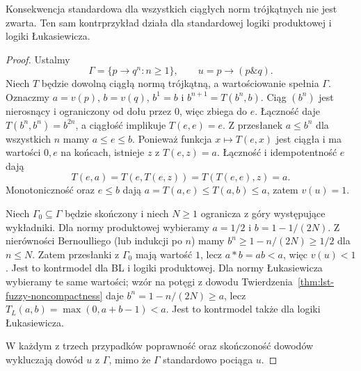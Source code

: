 \begin{twierdzenie}
\label{thm:lst-fuzzy-bl-noncompactness}
Konsekwencja standardowa dla wszystkich ciągłych norm
trójkątnych nie jest zwarta. Ten sam kontrprzykład działa
dla standardowej logiki produktowej i logiki Łukasiewicza.
\end{twierdzenie}
\begin{proof}
Ustalmy
\[
 \Gamma=\{p\to q^n:n\geq1\},\qquad
 u=p\to(p\mathbin{\&}q).
\]
Niech $T$ będzie dowolną ciągłą normą trójkątną,
a wartościowanie spełnia $\Gamma$. Oznaczmy $a=v(p)$,
$b=v(q)$, $b^1=b$ i $b^{n+1}=T(b^n,b)$.
Ciąg $(b^n)$ jest nierosnący i ograniczony od dołu przez $0$,
więc zbiega do $e$. Łączność daje
$T(b^n,b^n)=b^{2n}$, a ciągłość implikuje
$T(e,e)=e$. Z przesłanek $a\leq b^n$ dla wszystkich $n$
mamy $a\leq e\leq b$.
Ponieważ funkcja $x\mapsto T(e,x)$ jest ciągła i ma
wartości $0,e$ na końcach, istnieje $z$ z $T(e,z)=a$.
Łączność i idempotentność $e$ dają
\[
 T(e,a)=T(e,T(e,z))=T(T(e,e),z)=a.
\]
Monotoniczność oraz $e\leq b$ dają
$a=T(a,e)\leq T(a,b)\leq a$, zatem $v(u)=1$.

Niech $\Gamma_0\subseteq\Gamma$ będzie skończony i niech
$N\geq1$ ogranicza z góry występujące wykładniki.
Dla normy produktowej wybieramy $a=1/2$ i
$b=1-1/(2N)$. Z nierówności Bernoulliego (lub indukcji
po $n$) mamy $b^n\geq1-n/(2N)\geq1/2$ dla $n\leq N$.
Zatem przesłanki z $\Gamma_0$ mają wartość $1$, lecz
$a*b=ab<a$, więc $v(u)<1$.
Jest to kontrmodel dla BL i logiki produktowej.
Dla normy Łukasiewicza wybieramy te same wartości;
wzór na potęgi z dowodu Twierdzenia~\ref{thm:lst-fuzzy-noncompactness}
daje $b^n=1-n/(2N)\geq a$, lecz
$T_L(a,b)=\max(0,a+b-1)<a$.
Jest to kontrmodel także dla logiki Łukasiewicza.

W każdym z trzech przypadków poprawność oraz skończoność
dowodów wykluczają dowód $u$ z $\Gamma$, mimo że
$\Gamma$ standardowo pociąga $u$.
\end{proof}

